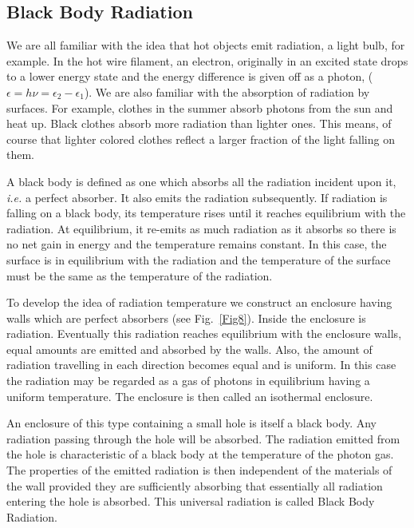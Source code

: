 \documentclass[book.tex]{subfiles}
\begin{document}
\subsection{Black Body Radiation}

We are all familiar with the idea that hot objects emit radiation, a light
bulb, for example. In the hot wire filament, an electron, originally in an excited
state drops to a lower energy state and the energy difference is given off as
a photon, ($\epsilon = h\nu = \epsilon_2 -\epsilon_1$). We are also familiar with the absorption of radiation by surfaces. For example, clothes in the summer absorb photons from the sun and heat up. Black clothes absorb more radiation than lighter ones. This means, of course that lighter colored clothes reflect a larger fraction of the light falling on them.

A black body is defined as one which absorbs all the radiation incident upon it, \textit{i.e.} a perfect absorber. It also emits the radiation subsequently. If radiation is falling on a black body, its temperature rises until it reaches equilibrium with the radiation. At equilibrium, it re-emits as much radiation as it absorbs so there is no net gain in energy and the temperature remains constant. In this case, the surface is in equilibrium with the radiation and the temperature of the surface must be the same as the temperature of the radiation.

To develop the idea of radiation temperature we construct an enclosure having walls which are perfect absorbers (see Fig.~\ref{Fig8}). Inside the enclosure is radiation. Eventually this radiation reaches equilibrium with the enclosure walls, equal amounts are emitted and absorbed by the walls. Also, the amount of radiation travelling in each direction becomes equal and is uniform. In this case the radiation may be regarded as a gas of photons in equilibrium having a uniform temperature. The enclosure is then called an isothermal enclosure. 

An enclosure of this type containing a small hole is itself a black body. Any radiation passing through the hole will be absorbed. The radiation emitted from the hole is characteristic of a black body at the temperature of the photon gas. The properties of the emitted radiation is then independent of the materials of the wall provided they are sufficiently absorbing that essentially all radiation entering the hole is absorbed. This universal radiation is called Black Body Radiation.

\end{document}
